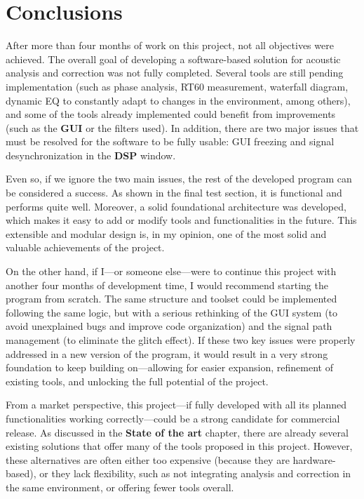 \chapter{Conclusions}

After more than four months of work on this project, not all objectives were achieved. The overall goal of developing a software-based solution for acoustic analysis and correction was not fully completed. Several tools are still pending implementation (such as phase analysis, RT60 measurement, waterfall diagram, dynamic EQ to constantly adapt to changes in the environment, among others), and some of the tools already implemented could benefit from improvements (such as the \textbf{GUI} or the filters used). In addition, there are two major issues that must be resolved for the software to be fully usable: GUI freezing and signal desynchronization in the \textbf{DSP} window.

Even so, if we ignore the two main issues, the rest of the developed program can be considered a success. As shown in the final test section, it is functional and performs quite well. Moreover, a solid foundational architecture was developed, which makes it easy to add or modify tools and functionalities in the future. This extensible and modular design is, in my opinion, one of the most solid and valuable achievements of the project.

On the other hand, if I—or someone else—were to continue this project with another four months of development time, I would recommend starting the program from scratch. The same structure and toolset could be implemented following the same logic, but with a serious rethinking of the GUI system (to avoid unexplained bugs and improve code organization) and the signal path management (to eliminate the glitch effect). If these two key issues were properly addressed in a new version of the program, it would result in a very strong foundation to keep building on—allowing for easier expansion, refinement of existing tools, and unlocking the full potential of the project.

From a market perspective, this project—if fully developed with all its planned functionalities working correctly—could be a strong candidate for commercial release. As discussed in the \textbf{State of the art} chapter, there are already several existing solutions that offer many of the tools proposed in this project. However, these alternatives are often either too expensive (because they are hardware-based), or they lack flexibility, such as not integrating analysis and correction in the same environment, or offering fewer tools overall.

